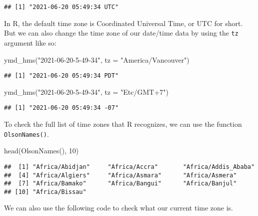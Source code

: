 \documentclass[
]{book}
\newenvironment{Shaded}{\begin{snugshade}}{\end{snugshade}}
\newcommand{\AttributeTok}[1]{\textcolor[rgb]{0.77,0.63,0.00}{#1}}
\newcommand{\DecValTok}[1]{\textcolor[rgb]{0.00,0.00,0.81}{#1}}
\newcommand{\FunctionTok}[1]{\textcolor[rgb]{0.00,0.00,0.00}{#1}}
\newcommand{\NormalTok}[1]{#1}
\newcommand{\StringTok}[1]{\textcolor[rgb]{0.31,0.60,0.02}{#1}}
\begin{document}
\begin{verbatim}
## [1] "2021-06-20 05:49:34 UTC"
\end{verbatim}

In R, the default time zone is Coordinated Universal Time, or UTC for short. But we can also change the time zone of our date/time data by using the \texttt{tz} argument like so:

\begin{Shaded}
\begin{Highlighting}[]
\FunctionTok{ymd\_hms}\NormalTok{(}\StringTok{"2021{-}06{-}20{-}5{-}49{-}34"}\NormalTok{, }\AttributeTok{tz =} \StringTok{"America/Vancouver"}\NormalTok{)}
\end{Highlighting}
\end{Shaded}

\begin{verbatim}
## [1] "2021-06-20 05:49:34 PDT"
\end{verbatim}

\begin{Shaded}
\begin{Highlighting}[]
\FunctionTok{ymd\_hms}\NormalTok{(}\StringTok{"2021{-}06{-}20{-}5{-}49{-}34"}\NormalTok{, }\AttributeTok{tz =} \StringTok{"Etc/GMT+7"}\NormalTok{)}
\end{Highlighting}
\end{Shaded}

\begin{verbatim}
## [1] "2021-06-20 05:49:34 -07"
\end{verbatim}

To check the full list of time zones that R recognizes, we can use the function \texttt{OlsonNames()}.

\begin{Shaded}
\begin{Highlighting}[]
\FunctionTok{head}\NormalTok{(}\FunctionTok{OlsonNames}\NormalTok{(), }\DecValTok{10}\NormalTok{)}
\end{Highlighting}
\end{Shaded}

\begin{verbatim}
##  [1] "Africa/Abidjan"     "Africa/Accra"       "Africa/Addis_Ababa"
##  [4] "Africa/Algiers"     "Africa/Asmara"      "Africa/Asmera"
##  [7] "Africa/Bamako"      "Africa/Bangui"      "Africa/Banjul"
## [10] "Africa/Bissau"
\end{verbatim}

We can also use the following code to check what our current time zone is.
\end{document}
